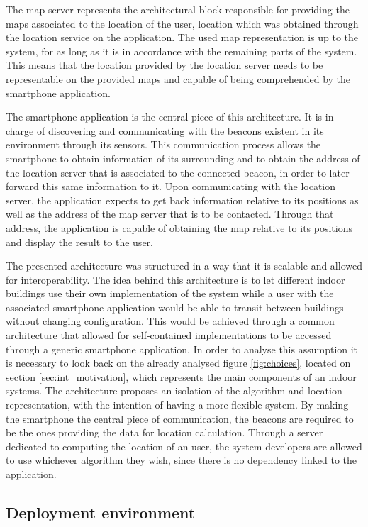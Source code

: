  
The map server represents the architectural block responsible for providing the maps associated to the location of the user, location which was obtained through the location service on the application. The used map representation is up to the system, for as long as it is in accordance with the remaining parts of the system. This means that the location provided by the location server needs to be representable on the provided maps and capable of being comprehended by the smartphone application.  
 
 
The smartphone application is the central piece of this architecture. It is in charge of discovering and communicating with the beacons existent in its environment through its sensors. This communication process allows the smartphone to obtain information of its surrounding and to obtain the address of the location server that is associated to the connected beacon, in order to later forward this same information to it. Upon communicating with the location server, the application expects to get back information relative to its positions as well as the address of the map server that is to be contacted. Through that address, the application is capable of obtaining the map relative to its positions and display the result to the user. 
 
 
The presented architecture was structured in a way that it is scalable and allowed for interoperability. The idea behind this architecture is to let different indoor buildings use their own implementation of the system while a user with the associated smartphone application would be able to transit between buildings without changing configuration. This would be achieved through a common architecture that allowed for self-contained implementations to be accessed through a generic smartphone application. In order to analyse this assumption it is necessary to look back on the already analysed figure \ref{fig:choices}, located on section \ref{sec:int_motivation}, which represents the main components of an indoor systems. The architecture proposes an isolation of the algorithm and location representation, with the intention of having a more flexible system. By making the smartphone the central piece of communication, the beacons are required to be the ones providing the data for location calculation. Through a server dedicated to computing the location of an user, the system developers are allowed to use whichever algorithm they wish, since there is no dependency linked to the application.  
 
 
\subsection{Deployment environment} 
\label{subsec:deployment} 
 
